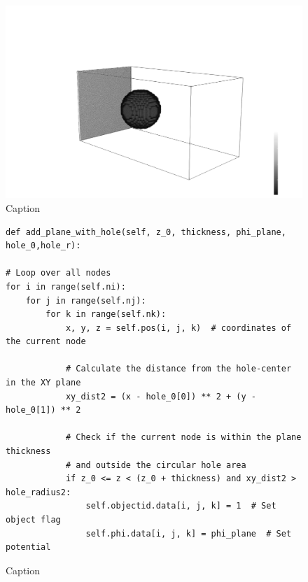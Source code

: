 \begin{figure}
    \centering
\includegraphics[width=0.7\linewidth]{figures/sphere_paraview.png}    
    \caption{Caption}
    \label{fig:enter-label}
\end{figure}




\begin{figure} [H]
    \centering
    \begin{lstlisting}
def add_plane_with_hole(self, z_0, thickness, phi_plane, hole_0,hole_r):

# Loop over all nodes
for i in range(self.ni):
    for j in range(self.nj):
        for k in range(self.nk):
            x, y, z = self.pos(i, j, k)  # coordinates of the current node
            
            # Calculate the distance from the hole-center in the XY plane
            xy_dist2 = (x - hole_0[0]) ** 2 + (y - hole_0[1]) ** 2
            
            # Check if the current node is within the plane thickness
            # and outside the circular hole area
            if z_0 <= z < (z_0 + thickness) and xy_dist2 > hole_radius2:
                self.objectid.data[i, j, k] = 1  # Set object flag
                self.phi.data[i, j, k] = phi_plane  # Set potential
    \end{lstlisting}
    \caption{Caption}
    \label{fig:enter-label}
\end{figure}
